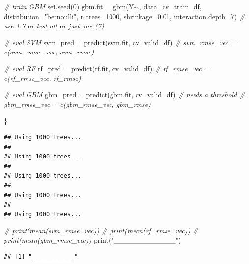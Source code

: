 \documentclass[
  11pt,
]{article}
\newenvironment{Shaded}{\begin{snugshade}}{\end{snugshade}}
\newcommand{\AttributeTok}[1]{\textcolor[rgb]{0.77,0.63,0.00}{#1}}
\newcommand{\CommentTok}[1]{\textcolor[rgb]{0.56,0.35,0.01}{\textit{#1}}}
\newcommand{\DecValTok}[1]{\textcolor[rgb]{0.00,0.00,0.81}{#1}}
\newcommand{\FloatTok}[1]{\textcolor[rgb]{0.00,0.00,0.81}{#1}}
\newcommand{\FunctionTok}[1]{\textcolor[rgb]{0.00,0.00,0.00}{#1}}
\newcommand{\NormalTok}[1]{#1}
\newcommand{\OtherTok}[1]{\textcolor[rgb]{0.56,0.35,0.01}{#1}}
\newcommand{\SpecialCharTok}[1]{\textcolor[rgb]{0.00,0.00,0.00}{#1}}
\newcommand{\StringTok}[1]{\textcolor[rgb]{0.31,0.60,0.02}{#1}}
\begin{document}
\begin{Shaded}
\begin{Highlighting}[]
  \CommentTok{\# train GBM}
  \FunctionTok{set.seed}\NormalTok{(}\DecValTok{0}\NormalTok{)}
\NormalTok{  gbm.fit }\OtherTok{=} \FunctionTok{gbm}\NormalTok{(Y}\SpecialCharTok{\textasciitilde{}}\NormalTok{., }
                \AttributeTok{data=}\NormalTok{cv\_train\_df,}
                \AttributeTok{distribution=}\StringTok{"bernoulli"}\NormalTok{,}
                \AttributeTok{n.trees=}\DecValTok{1000}\NormalTok{,}
                \AttributeTok{shrinkage=}\FloatTok{0.01}\NormalTok{, }
                \AttributeTok{interaction.depth=}\DecValTok{7}\NormalTok{) }\CommentTok{\# use 1:7 or test all or just one (7)}
  
  \CommentTok{\# eval SVM}
\NormalTok{  svm\_pred }\OtherTok{=} \FunctionTok{predict}\NormalTok{(svm.fit, cv\_valid\_df)}
  \CommentTok{\# svm\_rmse\_vec = c(svm\_rmse\_vec, svm\_rmse)}
  
  \CommentTok{\# eval RF}
\NormalTok{  rf\_pred }\OtherTok{=} \FunctionTok{predict}\NormalTok{(rf.fit, cv\_valid\_df)}
  \CommentTok{\# rf\_rmse\_vec = c(rf\_rmse\_vec, rf\_rmse)}
  
  \CommentTok{\# eval GBM}
\NormalTok{  gbm\_pred }\OtherTok{=} \FunctionTok{predict}\NormalTok{(gbm.fit, cv\_valid\_df)}
  \CommentTok{\# needs a threshold}
  \CommentTok{\# gbm\_rmse\_vec = c(gbm\_rmse\_vec, gbm\_rmse)}
  
\NormalTok{\}}
\end{Highlighting}
\end{Shaded}

\begin{verbatim}
## Using 1000 trees...
## 
## Using 1000 trees...
## 
## Using 1000 trees...
## 
## Using 1000 trees...
## 
## Using 1000 trees...
\end{verbatim}

\begin{Shaded}
\begin{Highlighting}[]
\CommentTok{\# print(mean(svm\_rmse\_vec))}
\CommentTok{\# print(mean(rf\_rmse\_vec))}
\CommentTok{\# print(mean(gbm\_rmse\_vec))}
\FunctionTok{print}\NormalTok{(}\StringTok{"\_\_\_\_\_\_\_\_\_\_\_\_"}\NormalTok{)}
\end{Highlighting}
\end{Shaded}

\begin{verbatim}
## [1] "____________"
\end{verbatim}
\end{document}
